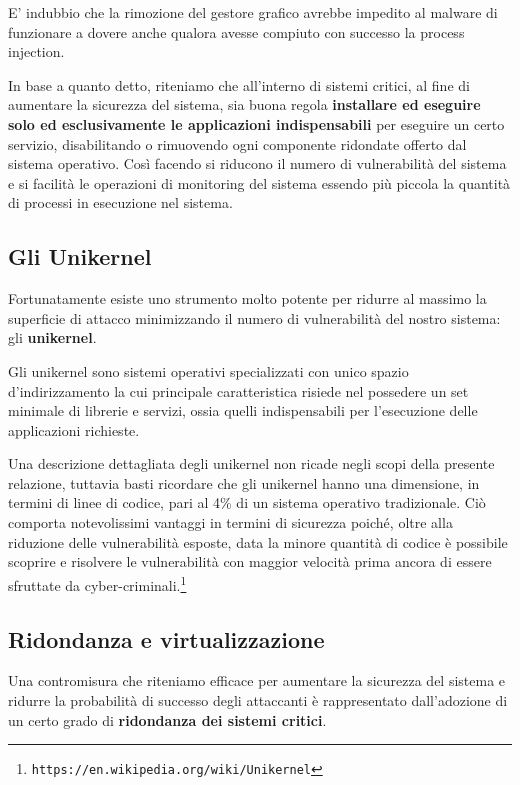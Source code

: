 \documentclass[10pt,a4paper, titlepage]{report}
\begin{document}
E' indubbio che la rimozione del gestore grafico avrebbe impedito al malware di funzionare a dovere anche qualora avesse compiuto con successo la process injection.

In base a quanto detto, riteniamo che all'interno di sistemi critici, al fine di aumentare la sicurezza del sistema, sia buona regola \textbf{installare ed eseguire solo ed esclusivamente le applicazioni indispensabili} per eseguire un certo servizio, disabilitando o rimuovendo ogni componente ridondate offerto dal sistema operativo. Così facendo si riducono il numero di vulnerabilità del sistema e si facilità le operazioni di monitoring del sistema essendo più piccola la quantità di processi in esecuzione nel sistema.

\subsection{Gli Unikernel}

Fortunatamente esiste uno strumento molto potente per ridurre al massimo la superficie di attacco minimizzando il numero di vulnerabilità del nostro sistema: gli \textbf{unikernel}. 

Gli unikernel sono sistemi operativi specializzati con unico spazio d'indirizzamento la cui principale caratteristica risiede nel possedere un set minimale di librerie e servizi, ossia quelli indispensabili per  l'esecuzione delle applicazioni richieste. 

Una descrizione dettagliata degli unikernel non ricade negli scopi della presente relazione, tuttavia basti ricordare che gli unikernel hanno una dimensione, in termini di linee di codice, pari al 4\% di un sistema operativo tradizionale. Ciò comporta notevolissimi vantaggi in termini di sicurezza poiché, oltre alla riduzione delle vulnerabilità esposte, data la minore quantità di codice è possibile scoprire e risolvere le vulnerabilità 
con maggior velocità prima ancora di essere sfruttate da cyber-criminali.\footnote{\texttt{https://en.wikipedia.org/wiki/Unikernel}}

\subsection{Ridondanza e virtualizzazione}

Una contromisura che riteniamo efficace per aumentare la sicurezza del sistema e ridurre la probabilità di successo degli attaccanti è rappresentato dall'adozione di un certo grado di \textbf{ridondanza dei sistemi critici}. 
\end{document}
